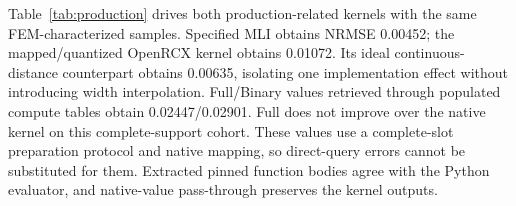 Table~\ref{tab:production} drives both production-related kernels with the same FEM-characterized samples. Specified MLI obtains NRMSE 0.00452; the mapped/quantized OpenRCX kernel obtains 0.01072. Its ideal continuous-distance counterpart obtains 0.00635, isolating one implementation effect without introducing width interpolation. Full/Binary values retrieved through populated compute tables obtain 0.02447/0.02901. Full does not improve over the native kernel on this complete-support cohort. These values use a complete-slot preparation protocol and native mapping, so direct-query errors cannot be substituted for them. Extracted pinned function bodies agree with the Python evaluator, and native-value pass-through preserves the kernel outputs.
